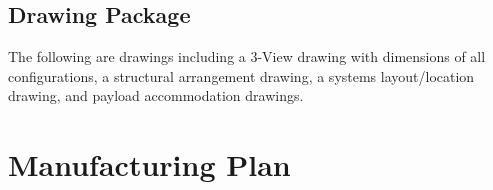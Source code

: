 \documentclass[report]{byu-aero}
\begin{document}
 
\subsection{Drawing Package}
\label{ssec:drawings}

The following are drawings including a 3-View drawing with dimensions of all configurations, a structural arrangement drawing, a systems layout/location drawing, and payload accommodation drawings.









\section{Manufacturing Plan} %
\label{sec:ManufacturingPlan}
\end{document}
